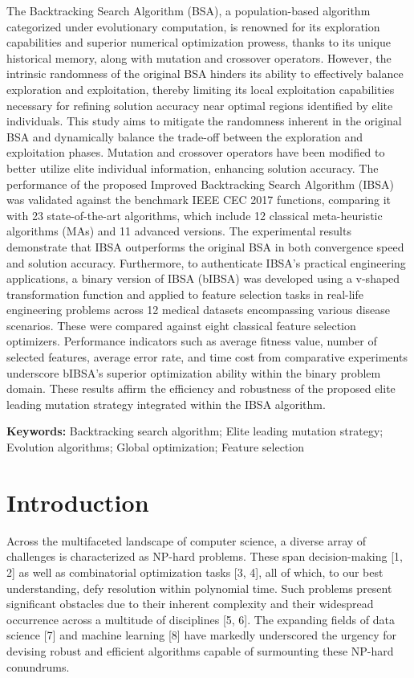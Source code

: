\documentclass{article} %
\begin{document}
\noindent The Backtracking Search Algorithm (BSA), a population-based algorithm categorized under evolutionary computation, is renowned for its exploration capabilities and superior numerical optimization prowess, thanks to its unique historical memory, along with mutation and crossover operators. However, the intrinsic randomness of the original BSA hinders its ability to effectively balance exploration and exploitation, thereby limiting its local exploitation capabilities necessary for refining solution accuracy near optimal regions identified by elite individuals. This study aims to mitigate the randomness inherent in the original BSA and dynamically balance the trade-off between the exploration and exploitation phases. Mutation and crossover operators have been modified to better utilize elite individual information, enhancing solution accuracy. The performance of the proposed Improved Backtracking Search Algorithm (IBSA) was validated against the benchmark IEEE CEC 2017 functions, comparing it with 23 state-of-the-art algorithms, which include 12 classical meta-heuristic algorithms (MAs) and 11 advanced versions. The experimental results demonstrate that IBSA outperforms the original BSA in both convergence speed and solution accuracy. Furthermore, to authenticate IBSA's practical engineering applications, a binary version of IBSA (bIBSA) was developed using a v-shaped transformation function and applied to feature selection tasks in real-life engineering problems across 12 medical datasets encompassing various disease scenarios. These were compared against eight classical feature selection optimizers. Performance indicators such as average fitness value, number of selected features, average error rate, and time cost from comparative experiments underscore bIBSA's superior optimization ability within the binary problem domain. These results affirm the efficiency and robustness of the proposed elite leading mutation strategy integrated within the IBSA algorithm.



\noindent \textbf{Keywords: }Backtracking search algorithm; Elite leading mutation strategy; Evolution algorithms; Global optimization; Feature selection\textbf{}


\section{  Introduction}

Across the multifaceted landscape of computer science, a diverse array of challenges is characterized as NP-hard problems. These span decision-making [1, 2] as well as combinatorial optimization tasks [3, 4], all of which, to our best understanding, defy resolution within polynomial time. Such problems present significant obstacles due to their inherent complexity and their widespread occurrence across a multitude of disciplines [5, 6]. The expanding fields of data science [7] and machine learning [8] have markedly underscored the urgency for devising robust and efficient algorithms capable of surmounting these NP-hard conundrums.
\end{document}
